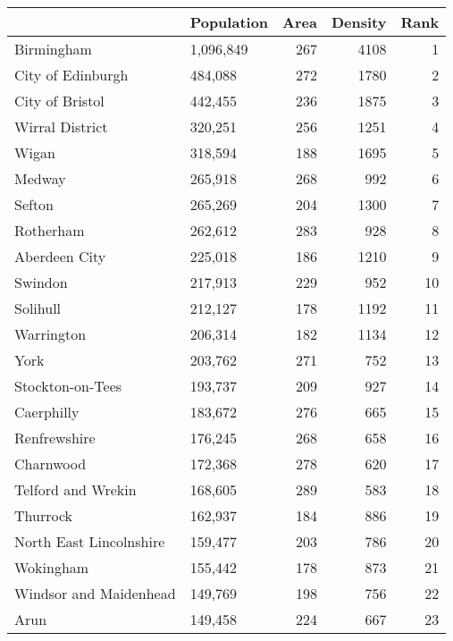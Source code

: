 \begin{tabular}{llrrr}
\toprule
{} & Population &  Area &  Density &  Rank \\
\midrule
Birmingham                &  1,096,849 &   267 &     4108 &     1 \\
City of Edinburgh         &    484,088 &   272 &     1780 &     2 \\
City of Bristol           &    442,455 &   236 &     1875 &     3 \\
Wirral District           &    320,251 &   256 &     1251 &     4 \\
Wigan                     &    318,594 &   188 &     1695 &     5 \\
Medway                    &    265,918 &   268 &      992 &     6 \\
Sefton                    &    265,269 &   204 &     1300 &     7 \\
Rotherham                 &    262,612 &   283 &      928 &     8 \\
Aberdeen City             &    225,018 &   186 &     1210 &     9 \\
Swindon                   &    217,913 &   229 &      952 &    10 \\
Solihull                  &    212,127 &   178 &     1192 &    11 \\
Warrington                &    206,314 &   182 &     1134 &    12 \\
York                      &    203,762 &   271 &      752 &    13 \\
Stockton-on-Tees          &    193,737 &   209 &      927 &    14 \\
Caerphilly                &    183,672 &   276 &      665 &    15 \\
Renfrewshire              &    176,245 &   268 &      658 &    16 \\
Charnwood                 &    172,368 &   278 &      620 &    17 \\
Telford and Wrekin        &    168,605 &   289 &      583 &    18 \\
Thurrock                  &    162,937 &   184 &      886 &    19 \\
North East Lincolnshire   &    159,477 &   203 &      786 &    20 \\
Wokingham                 &    155,442 &   178 &      873 &    21 \\
Windsor and Maidenhead    &    149,769 &   198 &      756 &    22 \\
Arun                      &    149,458 &   224 &      667 &    23 \\

\end{tabular}
